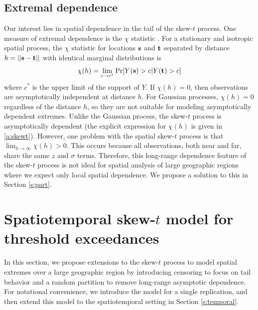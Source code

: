 \documentclass[useAMS,usenatbib,referee]{biom}
\begin{document}
\subsection{Extremal dependence}\label{s:extdep}
Our interest lies in spatial dependence in the tail of the skew-$t$ process.
One measure of extremal dependence is the $\chi$ statistic \citep{Coles1999}.
For a stationary and isotropic spatial process, the $\chi$ statistic for locations $\mbox{\bf s}$ and $\mbox{\bf t}$ separated by distance $h = || \mbox{\bf s} - \mbox{\bf t} ||$ with identical marginal distributions is
\begin{align}
  \chi(h) = \lim_{c \rightarrow c^*} \Pr[Y(\mbox{\bf s}) > c | Y(\mbox{\bf t}) > c]
\end{align}
where $c^*$ is the upper limit of the support of $Y$.
If $\chi(h) = 0$, then observations are asymptotically independent at distance $h$.
For Gaussian processes, $\chi(h) = 0$ regardless of the distance $h$, so they are not suitable for modeling asymptotically dependent extremes.
Unlike the Gaussian process, the skew-$t$ process is asymptotically dependent (the explicit expression for $\chi(h)$ is given in \ref{a:skewt}).
However, one problem with the spatial skew-$t$ process is that $\lim_{h \rightarrow \infty} \chi(h) > 0$.
This occurs because all observations, both near and far, share the same $z$ and $\sigma$ terms.
Therefore, this long-range dependence feature of the skew-$t$ process is not ideal for spatial analysis of large geographic regions where we expect only local spatial dependence.
We propose a solution to this in Section \ref{s:part}.

\section{Spatiotemporal skew-$t$ model for threshold exceedances}\label{s:spatial}
In this section, we propose extensions to the skew-$t$ process to model spatial extremes over a large geographic region by introducing censoring to focus on tail behavior and a random partition to remove long-range asymptotic dependence.
For notational convenience, we introduce the model for a single replication, and then extend this model to the spatiotemporal setting in Section \ref{s:temporal}.
\end{document}
